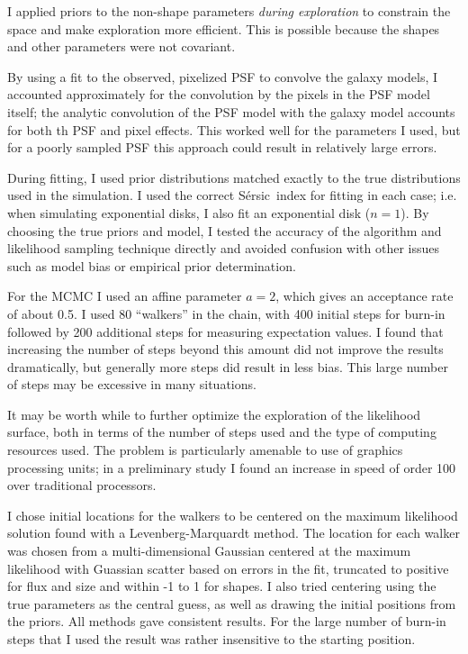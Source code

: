 \documentclass[12pt,preprint]{aastex}
\newcommand{\sersic}{S\'{e}rsic}
\begin{document}
I applied priors to the non-shape parameters {\it during exploration} to
constrain the space and make exploration more efficient.  This is possible
because the shapes and other parameters were not covariant.

By using a fit to the observed, pixelized PSF to convolve the galaxy models, I
accounted approximately for the convolution by the pixels in the PSF model
itself;  the analytic convolution of the PSF model with the galaxy model
accounts for both th PSF and pixel effects.  This worked well for the
parameters I used, but for a poorly sampled PSF this approach could result in
relatively large errors.

During fitting, I used prior distributions matched exactly to the true
distributions used in the simulation.  I used the correct \sersic\ index for
fitting in each case; i.e. when simulating exponential disks, I also fit an
exponential disk ($n=1$).  By choosing the true priors and model, I tested the
accuracy of the algorithm and likelihood sampling technique directly and
avoided confusion with other issues such as model bias or empirical prior
determination.

For the MCMC I used an affine parameter $a=2$, which gives an acceptance rate
of about 0.5. I used 80 ``walkers'' in the chain, with 400 initial steps for
burn-in followed by 200 additional steps for measuring expectation values.  I
found that increasing the number of steps beyond this amount did not improve
the results dramatically, but generally more steps did result in less bias.
This large number of steps may be excessive in many situations.

It may be worth while to further optimize the exploration of the likelihood
surface, both in terms of the number of steps used and the type of computing
resources used.  The problem is particularly amenable to use of graphics
processing units; in a preliminary study I found an increase in speed of order
100 over traditional processors.

I chose initial locations for the walkers to be centered on the maximum
likelihood solution found with a Levenberg-Marquardt method. The location for
each walker was chosen from a multi-dimensional Gaussian centered at the
maximum likelihood with Guassian scatter based on errors in the fit, truncated
to positive for flux and size and within -1 to 1 for shapes.  I also tried
centering using the true parameters as the central guess, as well as drawing
the initial positions from the priors.  All methods gave consistent results.
For the large number of burn-in steps that I used the result was rather
insensitive to the starting position.
\end{document}

